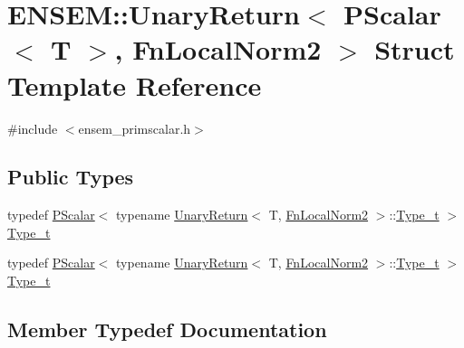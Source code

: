 \hypertarget{structENSEM_1_1UnaryReturn_3_01PScalar_3_01T_01_4_00_01FnLocalNorm2_01_4}{}\section{E\+N\+S\+EM\+:\+:Unary\+Return$<$ P\+Scalar$<$ T $>$, Fn\+Local\+Norm2 $>$ Struct Template Reference}
\label{structENSEM_1_1UnaryReturn_3_01PScalar_3_01T_01_4_00_01FnLocalNorm2_01_4}


{\ttfamily \#include $<$ensem\+\_\+primscalar.\+h$>$}

\subsection*{Public Types}
\begin{DoxyCompactItemize}
\item 
typedef \mbox{\hyperlink{classENSEM_1_1PScalar}{P\+Scalar}}$<$ typename \mbox{\hyperlink{structENSEM_1_1UnaryReturn}{Unary\+Return}}$<$ T, \mbox{\hyperlink{structENSEM_1_1FnLocalNorm2}{Fn\+Local\+Norm2}} $>$\+::\mbox{\hyperlink{structENSEM_1_1UnaryReturn_3_01PScalar_3_01T_01_4_00_01FnLocalNorm2_01_4_a852277c387f03da96f75945baafceac6}{Type\+\_\+t}} $>$ \mbox{\hyperlink{structENSEM_1_1UnaryReturn_3_01PScalar_3_01T_01_4_00_01FnLocalNorm2_01_4_a852277c387f03da96f75945baafceac6}{Type\+\_\+t}}
\item 
typedef \mbox{\hyperlink{classENSEM_1_1PScalar}{P\+Scalar}}$<$ typename \mbox{\hyperlink{structENSEM_1_1UnaryReturn}{Unary\+Return}}$<$ T, \mbox{\hyperlink{structENSEM_1_1FnLocalNorm2}{Fn\+Local\+Norm2}} $>$\+::\mbox{\hyperlink{structENSEM_1_1UnaryReturn_3_01PScalar_3_01T_01_4_00_01FnLocalNorm2_01_4_a852277c387f03da96f75945baafceac6}{Type\+\_\+t}} $>$ \mbox{\hyperlink{structENSEM_1_1UnaryReturn_3_01PScalar_3_01T_01_4_00_01FnLocalNorm2_01_4_a852277c387f03da96f75945baafceac6}{Type\+\_\+t}}
\end{DoxyCompactItemize}


\subsection{Member Typedef Documentation}
\mbox{\label{structENSEM_1_1UnaryReturn_3_01PScalar_3_01T_01_4_00_01FnLocalNorm2_01_4_a852277c387f03da96f75945baafceac6}} 
